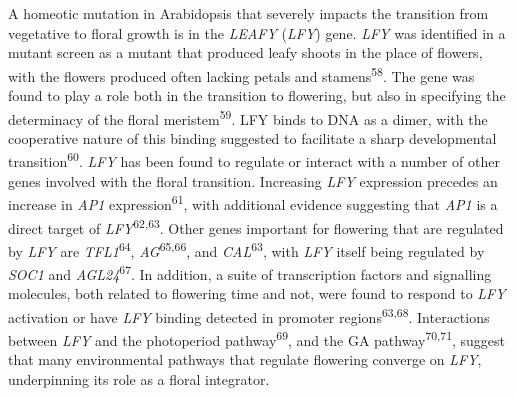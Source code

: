 \documentclass[12pt,]{book}
\begin{document}
A homeotic mutation in Arabidopsis that severely impacts the transition
from vegetative to floral growth is in the \emph{LEAFY} (\emph{LFY})
gene. \emph{LFY} was identified in a mutant screen as a mutant that
produced leafy shoots in the place of flowers, with the flowers produced
often lacking petals and stamens\textsuperscript{58}. The gene was found
to play a role both in the transition to flowering, but also in
specifying the determinacy of the floral meristem\textsuperscript{59}.
LFY binds to DNA as a dimer, with the cooperative nature of this binding
suggested to facilitate a sharp developmental
transition\textsuperscript{60}. \emph{LFY} has been found to regulate or
interact with a number of other genes involved with the floral
transition. Increasing \emph{LFY} expression precedes an increase in
\emph{AP1} expression\textsuperscript{61}, with additional evidence
suggesting that \emph{AP1} is a direct target of
\emph{LFY}\textsuperscript{62,63}. Other genes important for flowering
that are regulated by \emph{LFY} are \emph{TFL1}\textsuperscript{64},
\emph{AG}\textsuperscript{65,66}, and \emph{CAL}\textsuperscript{63},
with \emph{LFY} itself being regulated by \emph{SOC1} and
\emph{AGL24}\textsuperscript{67}. In addition, a suite of transcription
factors and signalling molecules, both related to flowering time and
not, were found to respond to \emph{LFY} activation or have \emph{LFY}
binding detected in promoter regions\textsuperscript{63,68}.
Interactions between \emph{LFY} and the photoperiod
pathway\textsuperscript{69}, and the GA pathway\textsuperscript{70,71},
suggest that many environmental pathways that regulate flowering
converge on \emph{LFY}, underpinning its role as a floral integrator.
\end{document}
